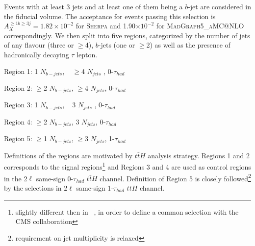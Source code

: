 Events with at least 3 jets and at least one of them being a $b$-jet are considered in the fiducial volume. 
The acceptance for events passing this selection is $A_X^{\geq1b\geq3j}=1.82\times10^{-2}$ for \textsc{Sherpa} and 1.90$\times10^{-2}$ for \textsc{MadGraph5\_aMC@NLO} correspondingly.
We then split into five regions, categorized by the number of jets of any flavour (three or  $\geq$4), $b$-jets (one or $\geq$2) as well as the presence of hadronically decaying $\tau$ lepton. 
				\begin{description}
				\item Region 1: 1 $N_{b-jets}$, ~ $\geq$4 $N_{jets}$ , 0-$\tau_{had}$
				\item Region 2: $\geq$2 $N_{b-jets}$,   $\geq$4 $N_{jets}$, 0-$\tau_{had}$
				\item Region 3: 1 $N_{b-jets}$, ~  3 $N_{jets}$ , 0-$\tau_{had}$
				\item Region 4: $\geq$2 $N_{b-jets}$, 3 $N_{jets}$, 0-$\tau_{had}$
				\item Region 5: $\geq$1 $N_{b-jets}$, $\geq$3 $N_{jets}$, 1-$\tau_{had}$
				\end{description}
Definitions of the regions are motivated by $t\bar{t}H$ analysis strategy.
Regions 1 and 2 corresponds to the signal regions\footnote{slightly different then in ~\cite{ATLAS-CONF-2019-045}, in order to define a common selection with the CMS collaboration} and Regions 3 and 4 are used as control regions in the 2$\ell$ same-sign  0-$\tau_{had}$ $t\bar{t}H$ channel.
Definition of Region 5 is closely followed\footnote{requirement on jet multiplicity is relaxed} by the selections in 2$\ell$ same-sign 1-$\tau_{had}$ $t\bar{t}H$ channel.





